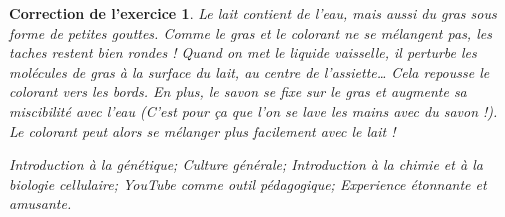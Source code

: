 \documentclass[12pt]{article}
\theoremstyle{break}
\newtheorem{cor}{Correction de l'exercice}
\begin{document}
\begin{cor}

Le lait contient de l’eau, mais aussi du gras sous forme de petites gouttes. Comme le gras et le colorant ne se mélangent pas, les taches restent bien rondes ! Quand on met le liquide vaisselle, il perturbe les molécules de gras à la surface du lait, au centre de l’assiette… Cela repousse le colorant vers les bords. En plus, le savon se fixe sur le gras et augmente sa miscibilité avec l'eau (C'est pour ça que l'on se lave les mains avec du savon !). Le colorant peut alors se mélanger plus facilement avec le lait !

\textit{Introduction à la génétique; Culture générale; Introduction à la chimie et à la biologie cellulaire; YouTube comme outil pédagogique; Experience étonnante et amusante. }

\end{cor}
\end{document}
